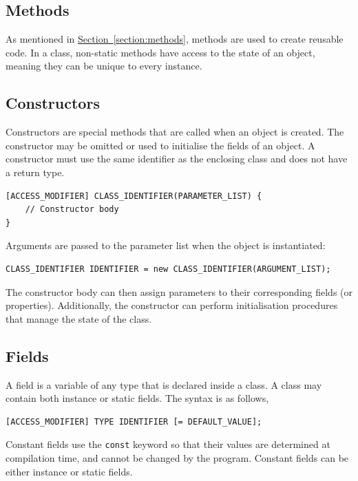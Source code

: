 \documentclass{article}
\begin{document}
\subsection{Methods}
As mentioned in \hyperref[section:methods]{Section~\ref{section:methods}}, methods are used to 
create reusable code. In a class, non-static methods have access to the 
state of an object, meaning they can be unique to every instance.
\subsection{Constructors}
Constructors are special methods that are called when an object is created. 
The constructor may be omitted or used to initialise the fields of an object.
A constructor must use the same identifier as the enclosing class and does not have a return type.
\begin{lstlisting}[numbers=none]
[ACCESS_MODIFIER] CLASS_IDENTIFIER(PARAMETER_LIST) {
    // Constructor body
}
\end{lstlisting}
Arguments are passed to the parameter list when the object is instantiated:
\begin{lstlisting}[numbers=none]
CLASS_IDENTIFIER IDENTIFIER = new CLASS_IDENTIFIER(ARGUMENT_LIST); 
\end{lstlisting}
The constructor body can then assign parameters to their corresponding fields (or properties).
Additionally, the constructor can perform initialisation procedures that manage the state of the class.
\subsection{Fields}
A field is a variable of any type that is declared inside a class. A class may contain both instance 
or static fields. The syntax is as follows,
\begin{lstlisting}[numbers=none]
[ACCESS_MODIFIER] TYPE IDENTIFIER [= DEFAULT_VALUE];
\end{lstlisting}
Constant fields use the \lstinline{const} keyword so that their values are determined at compilation time, and cannot be changed
by the program. Constant fields can be either instance or static fields.
\end{document}
